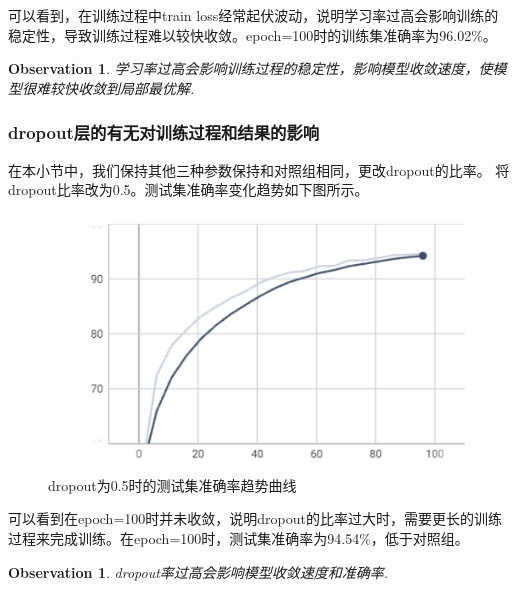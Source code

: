 \documentclass[11pt]{article}
\newtheorem{observation}[theorem]{Observation}
\begin{document}
可以看到，在训练过程中train loss经常起伏波动，说明学习率过高会影响训练的稳定性，导致训练过程难以较快收敛。epoch=100时的训练集准确率为96.02\%。
\begin{observation}
学习率过高会影响训练过程的稳定性，影响模型收敛速度，使模型很难较快收敛到局部最优解.\par
\end{observation}

\subsubsection{dropout层的有无对训练过程和结果的影响}
在本小节中，我们保持其他三种参数保持和对照组相同，更改dropout的比率。
将dropout比率改为0.5。测试集准确率变化趋势如下图所示。\par
\begin{figure}[H]
\centering
\includegraphics[scale=0.6]{images/dr05.png}
\caption{dropout为0.5时的测试集准确率趋势曲线}
\end{figure}
可以看到在epoch=100时并未收敛，说明dropout的比率过大时，需要更长的训练过程来完成训练。在epoch=100时，测试集准确率为94.54\%，低于对照组。\par
\begin{observation}
dropout率过高会影响模型收敛速度和准确率.\par
\end{observation}
\end{document}
